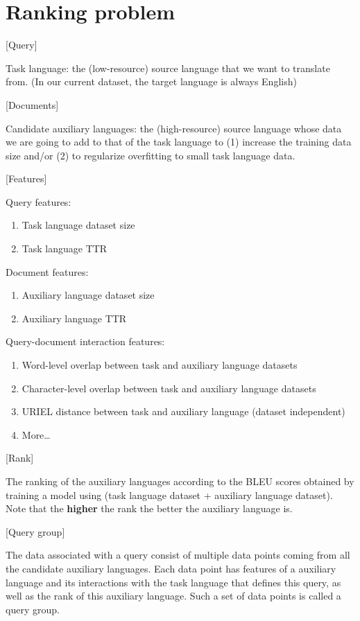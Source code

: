 \documentclass{article}
\begin{document}
\clearpage


\section{Ranking problem}

[Query]

Task language: the (low-resource) source language that we want to translate from. (In our current dataset, the target language is always English)

[Documents]

Candidate auxiliary languages: the (high-resource) source language whose data we are going to add to that of the task language to (1) increase the training data size and/or (2) to regularize overfitting to small task language data.

[Features]

Query features:
\begin{enumerate}
\item Task language dataset size
\item Task language TTR
\end{enumerate}

Document features:
\begin{enumerate}
\item Auxiliary language dataset size
\item Auxiliary language TTR
\end{enumerate}

Query-document interaction features:
\begin{enumerate}
\item Word-level overlap between task and auxiliary language datasets
\item Character-level overlap between task and auxiliary language datasets
\item URIEL distance between task and auxiliary language (dataset independent)
\item More\dots
\end{enumerate}

[Rank]

The ranking of the auxiliary languages according to the BLEU scores obtained by training a model using (task language dataset + auxiliary language dataset). Note that the {\bf higher} the rank the better the auxiliary language is.

[Query group]

The data associated with a query consist of multiple data points coming from all the candidate auxiliary languages. Each data point has features of a auxiliary language and its interactions with the task language that defines this query, as well as the rank of this auxiliary language. Such a set of data points is called a query group.
\end{document}
